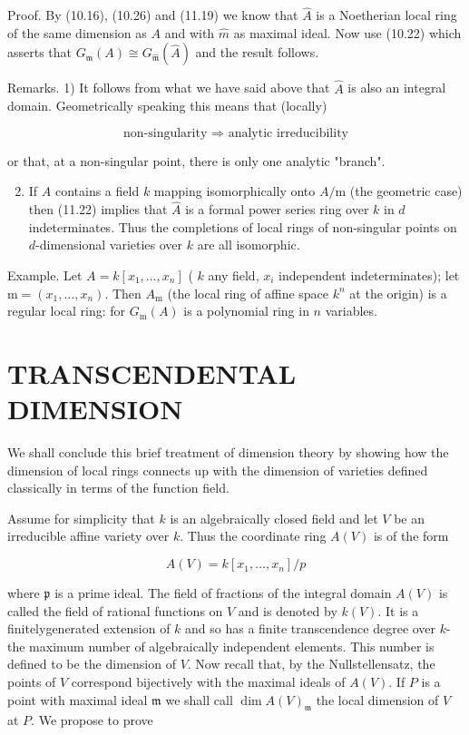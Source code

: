 \documentclass{standalone}
\theoremstyle{definition}
\theoremstyle{remark}
\begin{document}
Proof. By (10.16), (10.26) and (11.19) we know that $\hat{A}$ is a Noetherian local ring of the same dimension as $A$ and with $\hat{m}$ as maximal ideal. Now use (10.22) which asserts that $G_{\mathfrak{m}}(A) \cong G_{\hat{\mathfrak{m}}}(\hat{A})$ and the result follows.

Remarks. 1) It follows from what we have said above that $\hat{A}$ is also an integral domain. Geometrically speaking this means that (locally)

\[
\text { non-singularity } \Rightarrow \text { analytic irreducibility }
\]

or that, at a non-singular point, there is only one analytic "branch".

\begin{enumerate}
  \setcounter{enumi}{1}
  \item If $A$ contains a field $k$ mapping isomorphically onto $A / \mathrm{m}$ (the geometric case) then (11.22) implies that $\hat{A}$ is a formal power series ring over $k$ in $d$ indeterminates. Thus the completions of local rings of non-singular points on $d$-dimensional varieties over $k$ are all isomorphic.
\end{enumerate}

Example. Let $A=k\left[x_{1}, \ldots, x_{n}\right]$ ( $k$ any field, $x_{i}$ independent indeterminates); let $\mathrm{m}=\left(x_{1}, \ldots, x_{n}\right)$. Then $A_{\mathrm{m}}$ (the local ring of affine space $k^{n}$ at the origin) is a regular local ring: for $G_{\mathrm{m}}(A)$ is a polynomial ring in $n$ variables.

\section{TRANSCENDENTAL DIMENSION}
We shall conclude this brief treatment of dimension theory by showing how the dimension of local rings connects up with the dimension of varieties defined classically in terms of the function field.

Assume for simplicity that $k$ is an algebraically closed field and let $V$ be an irreducible affine variety over $k$. Thus the coordinate ring $A(V)$ is of the form

\[
A(V)=k\left[x_{1}, \ldots, x_{n}\right] / p
\]

where $\mathfrak{p}$ is a prime ideal. The field of fractions of the integral domain $A(V)$ is called the field of rational functions on $V$ and is denoted by $k(V)$. It is a finitelygenerated extension of $k$ and so has a finite transcendence degree over $k$-the maximum number of algebraically independent elements. This number is defined to be the dimension of $V$. Now recall that, by the Nullstellensatz, the points of $V$ correspond bijectively with the maximal ideals of $A(V)$. If $P$ is a point with maximal ideal $\mathfrak{m}$ we shall call $\operatorname{dim} A(V)_{\mathfrak{m}}$ the local dimension of $V$ at $P$. We propose to prove
\end{document}

